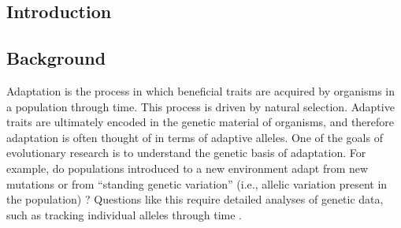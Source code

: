 \begin{doublespace}

\chapter*{Introduction}



\section*{Background}

Adaptation is the process in which beneficial traits
are acquired by organisms in a population through time.
%
This process is driven by natural selection.
%
Adaptive traits are ultimately encoded in the genetic material of organisms,
and therefore adaptation is often thought of in terms of adaptive alleles.
%
One of the goals of evolutionary research
is to understand the genetic basis of adaptation.
%
For example, do populations introduced to a new environment
adapt from new mutations or from ``standing genetic variation''
(i.e., allelic variation present in the population) \citep{orr05}?
%
Questions like this require detailed analyses of genetic data,
such as tracking individual alleles through time \citep{bar08}.




\end{doublespace}

